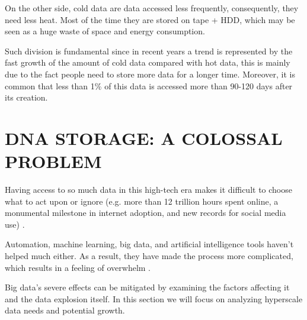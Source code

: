 \documentclass[10pt,twocolumn,twoside]{gsajnl}
\begin{document}
On the other side, cold data are data accessed less frequently, consequently, they need less heat. Most of the time they are stored on tape + HDD, which may be seen as a huge waste of space and energy consumption.

Such division is fundamental since in recent years a trend is represented by the fast growth of the amount of cold data compared with hot data, this is mainly due to the fact people need to store more data for a longer time. Moreover, it is common that less than 1\% of this data is accessed more than 90-120 days after its creation. 

\section{DNA STORAGE: A COLOSSAL PROBLEM}

\par Having access to so much data in this high-tech era makes it difficult to choose what to act upon or ignore (e.g. more than 12 trillion hours spent online, a monumental milestone in internet adoption, and new records for social media use) \cite{datareportal}.
\par Automation, machine learning, big data, and artificial intelligence tools haven't helped much either. As a result, they have made the process more complicated, which results in a feeling of overwhelm \cite{alliance2021preserving}.
\par Big data's severe effects can be mitigated by examining the factors affecting it and the data explosion itself. In this section we will focus on analyzing hyperscale data needs and potential growth.
\end{document}
